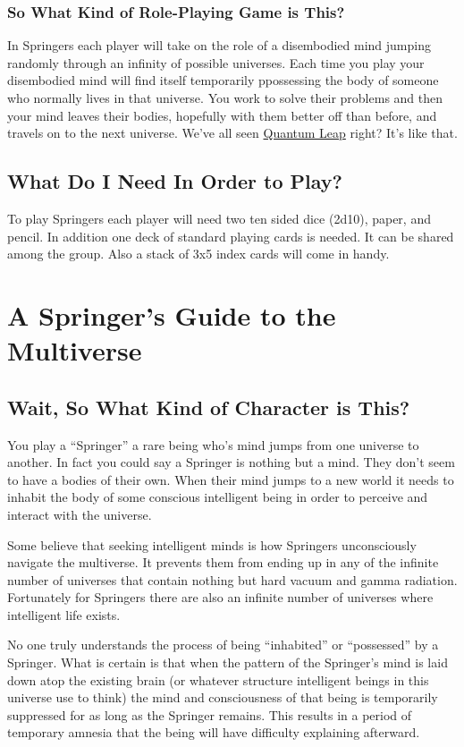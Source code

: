 \documentclass[letterpaper,12pt,landscape,twocolumn]{book}
\begin{document}
\subsection{So What Kind of Role-Playing Game is This?}
In Springers each player will take on the role of a disembodied mind
jumping randomly through an infinity of possible universes. Each time
you play your disembodied mind will find itself temporarily
ppossessing the body of someone who normally lives in that universe. You
work to solve their problems and then your mind leaves their bodies,
hopefully with them better off than before, and travels on to the next
universe. 
\newline
We've all seen
\href{https://en.wikipedia.org/wiki/Quantum_Leap}{Quantum Leap} right?
It's like that.   

\section{What Do I Need In Order to Play?}
To play Springers each player will need two ten sided dice (2d10),
paper, and pencil. In addition one deck of standard playing cards is
needed. It can be shared among the group. Also a stack of 3x5 index
cards will come in handy.

\chapter{A Springer's Guide to the Multiverse}

\section{Wait, So What Kind of Character is This?}

You play a ``Springer'' a rare being who's mind jumps from one universe to
another. In fact you could say a Springer is nothing but a mind. They don't
seem to have a bodies of their own. When their mind jumps to a new world
it needs to inhabit the body of some conscious intelligent being in
order to perceive and interact with the universe. 

Some believe that
seeking intelligent minds is how Springers unconsciously navigate the
multiverse. It prevents them from ending up in any of the infinite
number of universes that contain nothing but hard vacuum and gamma
radiation. Fortunately for Springers there are also an infinite number
of universes where intelligent life exists. 

No one truly understands the process of being ``inhabited'' or
``possessed'' by a Springer. What is certain is that when the pattern
of the Springer's mind is laid down atop the existing brain (or
whatever structure intelligent beings in this universe use to think)
the mind and consciousness of that being is temporarily
suppressed for as long as the Springer remains. This results in a
period of temporary amnesia that the being will have difficulty
explaining afterward. 
\end{document}
